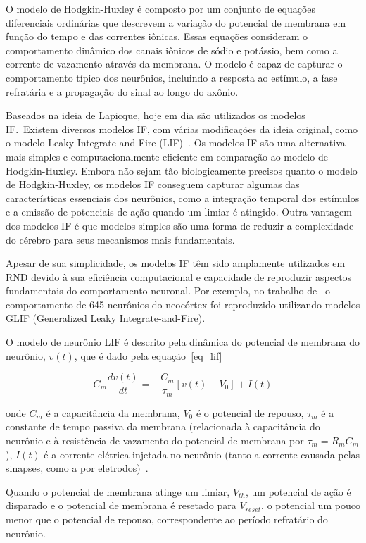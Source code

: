 O modelo de Hodgkin-Huxley é composto por um conjunto de equações diferenciais ordinárias que descrevem a variação do potencial de
membrana em função do tempo e das correntes iônicas. Essas equações consideram o comportamento dinâmico dos canais iônicos de
sódio e potássio, bem como a corrente de vazamento através da membrana. O modelo é capaz de capturar o comportamento típico dos
neurônios, incluindo a resposta ao estímulo, a fase refratária e a propagação do sinal ao longo do axônio.

Baseados na ideia de Lapicque, hoje em dia são utilizados os modelos IF.\ Existem diversos modelos IF, com
várias modificações da ideia original, como o modelo Leaky Integrate-and-Fire (LIF)~\cite{burkittReview2006}. Os modelos IF são
uma alternativa mais simples e computacionalmente eficiente em comparação ao modelo de Hodgkin-Huxley. Embora não sejam tão
biologicamente precisos quanto o modelo de Hodgkin-Huxley, os modelos IF conseguem capturar algumas das características essenciais
dos neurônios, como a integração temporal dos estímulos e a emissão de potenciais de ação quando um limiar é atingido. Outra
vantagem dos modelos IF é que modelos simples são uma forma de reduzir a complexidade do cérebro para seus mecanismos mais
fundamentais.

Apesar de sua simplicidade, os modelos IF têm sido amplamente utilizados em RND devido à sua eficiência computacional e capacidade
de reproduzir aspectos fundamentais do comportamento neuronal. Por exemplo, no trabalho de~\cite{teeterGeneralized2018} o
comportamento de 645 neurônios do neocórtex foi reproduzido utilizando modelos GLIF (Generalized Leaky Integrate-and-Fire). 

O modelo de neurônio LIF é descrito pela dinâmica do potencial de membrana do neurônio, $v(t)$, que é dado pela
equação~\ref{eq_lif}

\begin{equation}
\label{eq_lif}
C_m \frac{dv(t)}{dt} = -\frac{C_m}{\tau_m} [v(t) - V_0] + I(t)
\end{equation}

onde $C_m$ é a capacitância da membrana, $V_0$ é o potencial de repouso, $\tau_m$ é a constante de tempo passiva da membrana
(relacionada à capacitância do neurônio e à resistência de vazamento do potencial de membrana por $\tau_m = R_m C_m$), $I(t)$ é a
corrente elétrica injetada no neurônio (tanto a corrente causada pelas sinapses, como a por eletrodos)~\cite{burkittReview2006}. 

Quando o potencial de membrana atinge um limiar, $V_{th}$, um potencial de ação é disparado e o potencial de membrana é resetado
para $V_{reset}$, o potencial um pouco menor que o potencial de repouso, correspondente ao período refratário do neurônio.

